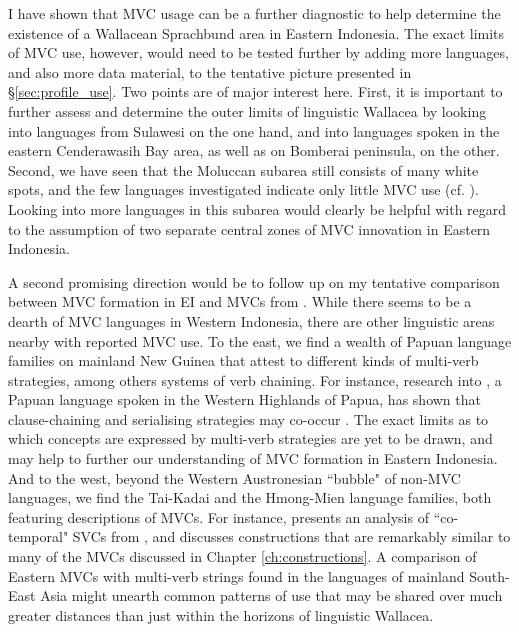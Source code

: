 I have shown that MVC usage can be a further diagnostic to help determine the existence of a Wallacean Sprachbund area in Eastern Indonesia. The exact limits of MVC use, however, would need to be tested further by adding more languages, and also more data material, to the tentative picture presented in §\ref{sec:profile_use}. Two points are of major interest here. First, it is important to further assess and determine the outer limits of linguistic Wallacea by looking into languages from Sulawesi on the one hand, and into languages spoken in the eastern Cenderawasih Bay area, as well as on Bomberai peninsula, on the other.  Second, we have seen that the Moluccan subarea still consists of many white spots, and the few languages investigated indicate only little MVC use (cf. ). Looking into more languages in this subarea would clearly be helpful with regard to the assumption of two separate central zones of MVC innovation in Eastern Indonesia.

A second promising direction would be to follow up on my tentative comparison between MVC formation in EI and MVCs from . While there seems to be a dearth of MVC languages in Western Indonesia, there are other linguistic areas nearby with reported MVC use. To the east, we find a wealth of Papuan language families on mainland New Guinea that attest to different kinds of multi-verb strategies, among others systems of verb chaining. For instance, research into , a Papuan language spoken in the Western Highlands of  Papua, has shown that clause-chaining and serialising strategies may co-occur \citep{riesberg2013}. The exact limits as to which concepts are expressed by multi-verb strategies are yet to be drawn, and may help to further our understanding of MVC formation in Eastern Indonesia. And to the west, beyond the Western Austronesian ``bubble" of non-MVC languages, we find the Tai-Kadai and the Hmong-Mien language families, both featuring descriptions of MVCs. For instance, \citet{jarkey2010cotemporal} presents an analysis of ``co-temporal" SVCs from , and discusses constructions that are remarkably similar to many of the MVCs discussed in Chapter \ref{ch:constructions}. A comparison of Eastern  MVCs with multi-verb strings found in the languages of mainland South-East Asia might unearth common patterns of use that may be shared over much greater distances than just within the horizons of linguistic Wallacea.

